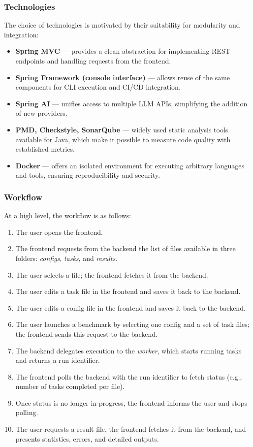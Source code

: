 \subsubsection{Technologies}

The choice of technologies is motivated by their suitability for modularity and integration:
\begin{itemize}
    \item \textbf{Spring MVC} --- provides a clean abstraction for implementing REST endpoints and handling requests from the frontend.
    \item \textbf{Spring Framework (console interface)} --- allows reuse of the same components for CLI execution and CI/CD integration.
    \item \textbf{Spring AI} --- unifies access to multiple LLM APIs, simplifying the addition of new providers.
    \item \textbf{PMD, Checkstyle, SonarQube} --- widely used static analysis tools available for Java, which make it possible to measure code quality with established metrics.
    \item \textbf{Docker} --- offers an isolated environment for executing arbitrary languages and tools, ensuring reproducibility and security.
\end{itemize}

\subsubsection{Workflow}

At a high level, the workflow is as follows:
\begin{enumerate}
    \item The user opens the frontend.
    \item The frontend requests from the backend the list of files available in three folders: \textit{configs}, \textit{tasks}, and \textit{results}.
    \item The user selects a file; the frontend fetches it from the backend.
    \item The user edits a task file in the frontend and saves it back to the backend.
    \item The user edits a config file in the frontend and saves it back to the backend.
    \item The user launches a benchmark by selecting one config and a set of task files; the frontend sends this request to the backend.
    \item The backend delegates execution to the \textit{worker}, which starts running tasks and returns a run identifier.
    \item The frontend polls the backend with the run identifier to fetch status (e.g., number of tasks completed per file).
    \item Once status is no longer in-progress, the frontend informs the user and stops polling.
    \item The user requests a result file, the frontend fetches it from the backend, and presents statistics, errors, and detailed outputs.
\end{enumerate}

